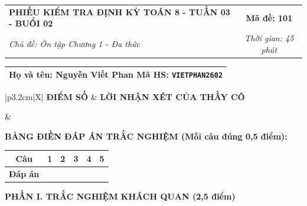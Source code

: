 \documentclass[12pt,a4paper]{article}
\begin{document}
\newpage



\noindent
\begin{tabularx}{\linewidth}{|X|c|}
\hline
\textbf{PHIẾU KIỂM TRA ĐỊNH KỲ TOÁN 8 - TUẦN 03 - BUỔI 02} & \textbf{Mã đề: 101} \\
\textit{Chủ đề: Ôn tập Chương 1 - Đa thức} & \textit{Thời gian: 45 phút} \\
\hline
\end{tabularx}

\vspace{1mm}

\noindent
\begin{tabularx}{\linewidth}{|X|}
\hline
\rule[-2mm]{0pt}{7.5mm}\textbf{Họ và tên:} \textbf{\large Nguyễn Viết Phan} \hfill \textbf{Mã HS:} \texttt{VIETPHAN2602} \quad \\
\hline
\end{tabularx}

\vspace{1mm}

\noindent
\begin{tabularx}{\linewidth}{|p{3.2cm}|X|}
\hline
\centering\textbf{ĐIỂM SỐ} & \centering\textbf{LỜI NHẬN XÉT CỦA THẦY CÔ} \tabularnewline
\hline
\rule{0pt}{1.3cm} & \tabularnewline
\hline
\end{tabularx}

\vspace{1.2mm}

\noindent\textbf{BẢNG ĐIỀN ĐÁP ÁN TRẮC NGHIỆM (Mỗi câu đúng 0,5 điểm):}
\vspace{0.8mm}

\noindent
\renewcommand{\arraystretch}{1.35}
\begin{tabularx}{\linewidth}{|c|*{5}{>{\centering\arraybackslash}X|}}
\hline
\textbf{Câu} & \textbf{1} & \textbf{2} & \textbf{3} & \textbf{4} & \textbf{5} \\
\hline
\textbf{Đáp án} & & & & & \\
\hline
\end{tabularx}
\renewcommand{\arraystretch}{1.0}

\vspace{1.5mm}

\noindent\textbf{\large PHẦN I. TRẮC NGHIỆM KHÁCH QUAN (2,5 điểm)}
\vspace{1mm}
\end{document}

